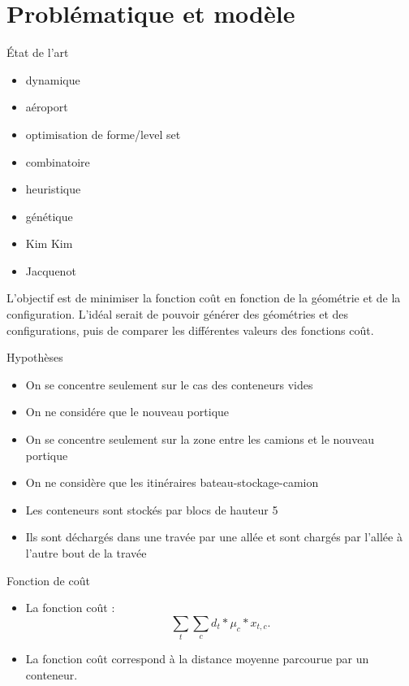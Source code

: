 \section{Problématique et modèle}

\begin{frame}{\'Etat de l'art}
  \begin{itemize}
  \item dynamique \cite{rekik2015}
  \item aéroport \cite{gotteland2004}
  \item optimisation de forme/level set \cite{allaire2006}
  \item combinatoire \cite{ndiaye2015}
  \item heuristique
  \item génétique
  \item Kim Kim \cite{kim98}
  \item Jacquenot \cite{jacquenot2010}
  \end{itemize}
  \vfill
  L'objectif est de minimiser la fonction coût en fonction de la géométrie et de la configuration.
  \vfill
  L'idéal serait de pouvoir générer des géométries et des configurations, puis de comparer les différentes valeurs des fonctions coût. 
  \vfill  
\end{frame}

\begin{frame}{Hypothèses}
  \begin{itemize}
  \item On se concentre seulement sur le cas des conteneurs vides
    \vfill
  \item On ne considére que le nouveau portique
    \vfill
  \item On se concentre seulement sur la zone entre les camions et le nouveau portique
    \vfill
  \item On ne considère que les itinéraires bateau-stockage-camion
    \vfill
  \item Les conteneurs sont stockés par blocs de hauteur 5
    \vfill
  \item Ils sont déchargés dans une travée par une allée et sont chargés par l'allée à l'autre bout de la travée
    \vfill
  \end{itemize}
  \vfill
\end{frame}

\begin{frame}{Fonction de coût}
  \vfill
  \begin{itemize}
  \item  La fonction coût  : 
    \vfill
    $$ \sum_t \sum_c d_t* \mu_c* x_{t,c}.  $$
    \vfill
  \item La fonction coût correspond à la distance moyenne parcourue par un conteneur.
  \end{itemize}
  \vfill
\end{frame}

